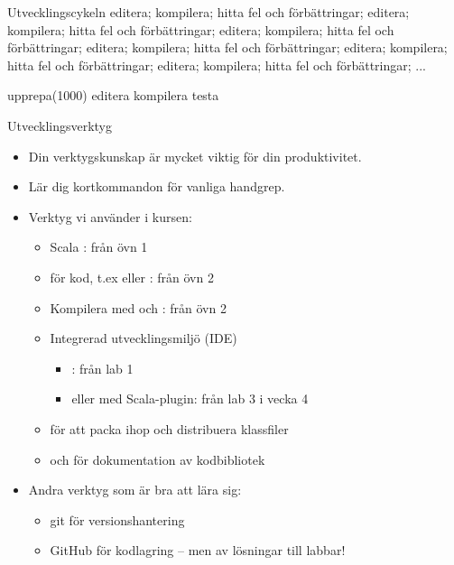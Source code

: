 \begin{Slide}{Utvecklingscykeln}
editera; kompilera; hitta fel och förbättringar; editera; kompilera; hitta fel och förbättringar; editera; kompilera; hitta fel och förbättringar; editera; kompilera; hitta fel och förbättringar; editera; kompilera; hitta fel och förbättringar; editera; kompilera; hitta fel och förbättringar; ...

\begin{Code}
upprepa(1000){
  editera
  kompilera
  testa
}
\end{Code}
\end{Slide}

\begin{Slide}{Utvecklingsverktyg}
\begin{itemize}
\item Din verktygskunskap är mycket viktig för din produktivitet. 
\item Lär dig kortkommandon för vanliga handgrep. 
\item Verktyg vi använder i kursen:
\begin{itemize}
\item Scala : från övn 1
\item {} för kod, t.ex  eller : från övn 2
\item Kompilera med  och : från övn 2
\item Integrerad utvecklingsmiljö (IDE)
\begin{itemize}
\item {}: från lab 1
\item {} eller  med Scala-plugin: från lab 3 i vecka 4
\end{itemize}
\item {} för att packa ihop och distribuera klassfiler
\item {} och  för dokumentation av kodbibliotek
\end{itemize}
\item Andra verktyg som är bra att lära sig:
\begin{itemize}
\item git för versionshantering
\item GitHub för kodlagring -- men  av lösningar till labbar!
\end{itemize}
\end{itemize}
\end{Slide}


